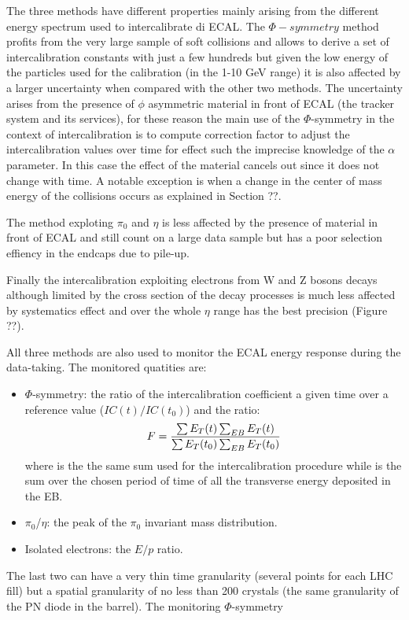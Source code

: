 The three methods have different properties mainly arising from the different energy spectrum used to intercalibrate di ECAL.
The $\Phi-symmetry$ method profits from the very large sample of soft collisions and allows to derive a set of intercalibration
constants with just a few hundreds \pbinv but given the low energy of the particles used for the calibration (in the 1-10 GeV range)
it is also affected by a larger uncertainty when compared with the other two methods.
The uncertainty arises from the presence of $\phi$ asymmetric material in front of ECAL
(the tracker system and its services), for these reason the main use of
the $\Phi$-symmetry in the context of intercalibration is to compute correction factor to adjust the intercalibration values
over time for effect such the imprecise knowledge of the $\alpha$ parameter. In this case the effect of the material cancels
out since it does not change with time. A notable exception is when a change in the center of mass energy of the collisions
occurs as explained in Section ??.

The method exploting $\pi_0$ and $\eta$ is less affected by the presence of material in front of ECAL and
still count on a large data sample but has a poor selection effiency in the endcaps due to pile-up.

Finally the intercalibration exploiting electrons from W and Z bosons decays although limited by the cross section
of the decay processes is much less affected by systematics effect and over the whole $\eta $ range has the best
precision (Figure ??).

All three methods are also used to monitor the ECAL energy response during the data-taking. The monitored quatities are:
\begin{itemize}
\item $\Phi$-symmetry: the ratio of the intercalibration coefficient a given time over a reference value ($IC(t)/IC(t_0)$) and
  the ratio:
  \[
F = \frac{\sum E_T(t)\sum_{EB} E_T(t)}{\sum E_T(t_0)\sum_{EB} E_T(t_0)}
\]
where \sumEt is the the same sum used for the intercalibration procedure while \sumEtEB is the sum over the chosen period of time
of all the transverse energy deposited in the EB.
\item $\pi_0$/$\eta$: the peak of the $\pi_0$ invariant mass distribution.
\item Isolated electrons: the $E/p$ ratio.
\end{itemize}

The last two can have a very thin time granularity (several points for each LHC fill) but a spatial granularity of no less
than 200 crystals (the same granularity of the PN diode in the barrel). The monitoring $\Phi$-symmetry

